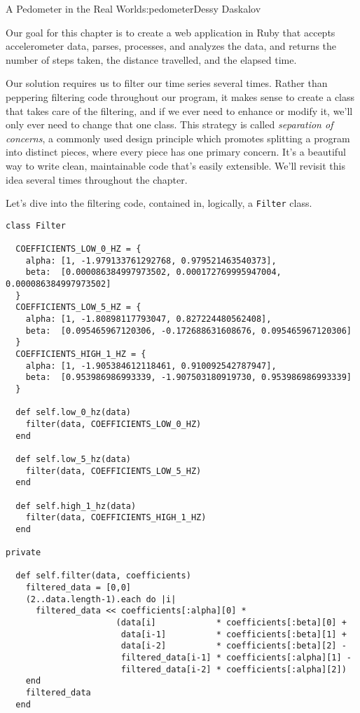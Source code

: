 \begin{aosachapter}{A Pedometer in the Real World}{s:pedometer}{Dessy Daskalov}
\label{diving-into-code}

Our goal for this chapter is to create a web application in Ruby that
accepts accelerometer data, parses, processes, and analyzes the data,
and returns the number of steps taken, the distance travelled, and the
elapsed time.

\label{preliminary-work}

Our solution requires us to filter our time series several times. Rather
than peppering filtering code throughout our program, it makes sense to
create a class that takes care of the filtering, and if we ever need to
enhance or modify it, we'll only ever need to change that one class.
This strategy is called \emph{separation of concerns}, a commonly used
design principle which promotes splitting a program into distinct
pieces, where every piece has one primary concern. It's a beautiful way
to write clean, maintainable code that's easily extensible. We'll
revisit this idea several times throughout the chapter.

Let's dive into the filtering code, contained in, logically, a
\texttt{Filter} class.

\begin{verbatim}
class Filter

  COEFFICIENTS_LOW_0_HZ = {
    alpha: [1, -1.979133761292768, 0.979521463540373],
    beta:  [0.000086384997973502, 0.000172769995947004, 0.000086384997973502]
  }
  COEFFICIENTS_LOW_5_HZ = {
    alpha: [1, -1.80898117793047, 0.827224480562408],
    beta:  [0.095465967120306, -0.172688631608676, 0.095465967120306]
  }
  COEFFICIENTS_HIGH_1_HZ = {
    alpha: [1, -1.905384612118461, 0.910092542787947],
    beta:  [0.953986986993339, -1.907503180919730, 0.953986986993339]
  }

  def self.low_0_hz(data)
    filter(data, COEFFICIENTS_LOW_0_HZ)
  end

  def self.low_5_hz(data)
    filter(data, COEFFICIENTS_LOW_5_HZ)
  end

  def self.high_1_hz(data)
    filter(data, COEFFICIENTS_HIGH_1_HZ)
  end

private

  def self.filter(data, coefficients)
    filtered_data = [0,0]
    (2..data.length-1).each do |i|
      filtered_data << coefficients[:alpha][0] *
                      (data[i]            * coefficients[:beta][0] +
                       data[i-1]          * coefficients[:beta][1] +
                       data[i-2]          * coefficients[:beta][2] -
                       filtered_data[i-1] * coefficients[:alpha][1] -
                       filtered_data[i-2] * coefficients[:alpha][2])
    end
    filtered_data
  end


\end{verbatim}
\end{aosachapter}
